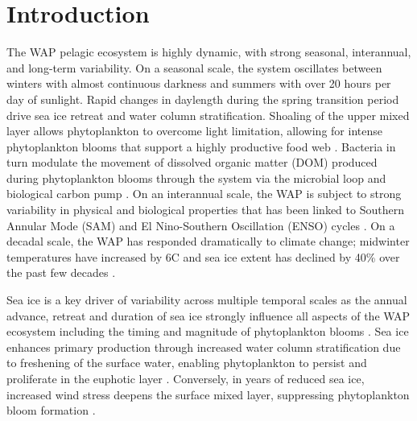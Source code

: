 \section{Introduction}

The WAP pelagic ecosystem is highly dynamic, with strong seasonal, interannual, and long-term variability. On a seasonal scale, the system oscillates between winters with almost continuous darkness and summers with over 20 hours per day of sunlight. Rapid changes in daylength during the spring transition period drive sea ice retreat and water column stratification. Shoaling of the upper mixed layer allows phytoplankton to overcome light limitation, allowing for intense phytoplankton blooms that support a highly productive food web \citep{Venables2013-me,Smetacek2005-tz}. Bacteria in turn modulate the movement of dissolved organic matter (DOM) produced during phytoplankton blooms through the system via the microbial loop and biological carbon pump \citep{Azam1991-xk,ducklow2001upper}. On an interannual scale, the WAP is subject to strong variability in physical and biological properties that has been linked to Southern Annular Mode (SAM) and El Nino-Southern Oscillation (ENSO) cycles \citep{saba2014winter,Kim2016-dl}. On a decadal scale, the WAP has responded dramatically to climate change; midwinter temperatures have increased by 6\textdegree C and sea ice extent has declined by 40\% over the past few decades \citep{dcddghmmmms12,Schofield2010-jj,Stammerjohn2008-nj}. 

Sea ice is a key driver of variability across multiple temporal scales as the annual advance, retreat and duration of sea ice strongly influence all aspects of the WAP ecosystem including the timing and magnitude of phytoplankton blooms \citep{dsvse12,mddfmss09}. Sea ice enhances primary production through increased water column stratification due to freshening of the surface water, enabling phytoplankton to persist and proliferate in the euphotic layer \citep{Smith1985-lx,Smith1986-en}. Conversely, in years of reduced sea ice, increased wind stress deepens the surface mixed layer, suppressing phytoplankton bloom formation \citep{saba2014winter}. 

